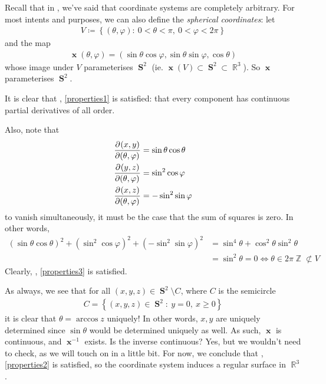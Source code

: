 \documentclass{amsart} %
\theoremstyle{mytheoremstyle}
\theoremstyle{definition}
\numberwithin{equation}{section}
\DeclareMathOperator{\R}{\mathbb{R}}
\DeclareMathOperator{\Z}{\mathbb{Z}}
\DeclareMathOperator{\1}{\mathbbm{1}}
\DeclareMathOperator{\x}{\mathbf{x}}
\DeclareMathOperator{\sphere}{\mathbf{S}}
\renewcommand{\geq}{\geqslant}
\renewcommand{\phi}{\varphi}
\newcommand{\condset}[4]{\left\{ #1  : \: #2 #3 #4 \right\}}
\renewcommand{\geq}{\geqslant}
\renewcommand{\phi}{\varphi}
\begin{document}
Recall that in , we've said that coordinate systems are completely arbitrary. For most intents and purposes, we can also define the \textit{spherical coordinates}: let
\begin{align*}
V \coloneqq \condset{(\theta,\phi)}{0 < \theta < \pi}{,}{\: 0 < \phi < 2\pi}
\end{align*}
and the map
\begin{align*}
\x (\theta,\phi) = (\sin \theta \cos \phi, \sin \theta \sin \phi, \cos \theta)
\end{align*}
whose image under $V$ parameterises $\sphere^2$ (ie. $\x (V) \subset \sphere^2 \subset \R^3$). So $\x$ parameterises $\sphere^2$.

It is clear that , \eqref{properties1} is satisfied: that every component has continuous partial derivatives of all order.

Also, note that 
\begin{align*}
\dpd{(x,y)}{(\theta,\phi)} &= \sin \theta \cos \theta \\
\dpd{(y,z)}{(\theta,\phi)} &= \sin^2 \cos \phi \\
\dpd{(x,z)}{(\theta,\phi)} &= -\sin^2 \sin \phi
\end{align*}
to vanish simultaneously, it must be the case that the sum of squares is zero. In other words,
\begin{align*}
(\sin \theta \cos \theta)^2 + (\sin^2 \cos \phi)^2 + ( -\sin^2 \sin \phi)^2 &= \sin^4 \theta  + \cos^2 \theta \sin^2 \theta \\
&= \sin^2 \theta = 0 \iff \theta \in 2\pi \Z \not\subset V
\end{align*}
Clearly, , \eqref{properties3} is satisfied.

As always, we see that for all $(x,y,z) \in \sphere^2 \setminus C$, where $C$ is the semicircle 
\begin{align*}
C = \condset{(x,y,z) \in \sphere^2}{y=0 }{,}{\: x \geq 0}
\end{align*}
it is clear that $\theta = \arccos z$ uniquely! In other words, $x,y $ are uniquely determined since $\sin \theta$ would be determined uniquely as well. As such, $\x$ is continuous, and $\x^{-1}$ exists. Is the inverse continuous? Yes, but we wouldn't need to check, as we will touch on in a little bit. For now, we conclude that , \eqref{properties2} is satisfied, so the coordinate system induces a regular surface in $\R^3$.
\end{document}
